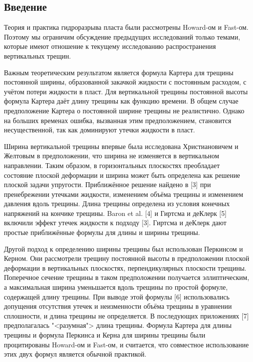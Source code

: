 \documentclass[a4paper, 11pt]{article}
\begin{document}
\subsection{Введение}
Теория и практика гидроразрыва пласта были рассмотрены Howard-ом и Fast-ом.
Поэтому мы ограничим обсуждение предыдущих исследований только темами, которые имеют отношение к текущему исследованию распространения вертикальных трещин.

Важным теоретическим результатом является формула Картера для трещины постоянной ширины, образованной закачкой жидкости с постоянным расходом, с учётом потери жидкости в пласт.
Для вертикальной трещины постоянной высоты формула Картера даёт длину трещины как функцию времени.
В общем случае предположение Картера о постоянной ширине трещины не реалистично.
Однако на больших временах ошибка, вызванная этим предположением, становится несущественной, так как доминируют утечки жидкости в пласт.

Ширина вертикальной трещины впервые была исследована Христиановичем и Желтовым в предположении, что ширина не изменяется в вертикальном направлении.
Таким образом, в горизонтальных плоскостях преобладает состояние плоской деформации и ширина может быть определена как решение плоской задачи упругости.
Приближённое решение найдено в [3] при пренебрежении утечками жидкости, изменением объёма трещины и изменением давления вдоль трещины.
Длина трещины определена из условия конечных напряжений на кончике трещины.
Baron et al. [4] и Гиртсма и деКлерк [5] включили эффект утечек жидкости к подходу [3].
Гиртсма и деКлерк дают простые приближённые формулы для длины и ширины трещины.

Другой подход к определению ширины трещины был использован Перкинсом и Керном.
Они рассмотрели трещину постоянной высоты в предположении плоской деформации в вертикальных плоскостях, перпендикулярных плоскости трещины.
Поперечное сечение трещины в таком предположении получается эллиптическим, а максимальная ширина уменьшается вдоль трещины по простой формуле, содержащей длину трещины.
При выводе этой формулы [6] использовались допущения отсутствия утечек и неизменности объёма трещины в уравнении сплошности, и длина трещины не определяется.
В последующих приложениях [7] предполагалась "<разумная"> длина трещины.
Формула Картера для длины трещины и формула Перкинса и Керна для ширины трещины были процитированы Howard-ом и Fast-ом, и считается, что совместное использование этих двух формул является обычной практикой.
\end{document}
